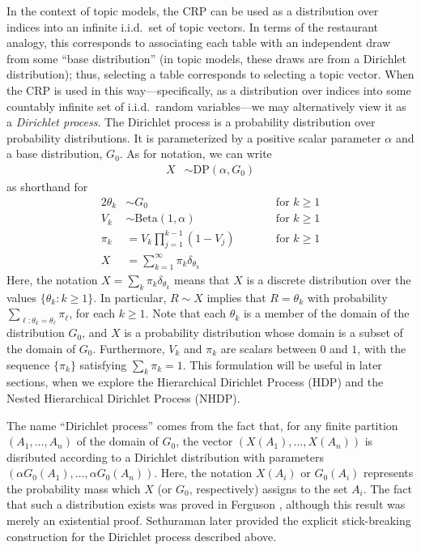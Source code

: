 \documentclass{article}
\begin{document}
In the context of topic models, the CRP can be used as a distribution over indices into an infinite i.i.d.\ set of topic vectors.
In terms of the restaurant analogy, this corresponds to associating each table with an independent draw from some ``base distribution'' (in topic models, these draws are from a Dirichlet distribution); thus, selecting a table corresponds to selecting a topic vector.
When the CRP is used in this way---specifically, as a distribution over indices into some countably infinite set of i.i.d.\ random variables---we may alternatively view it as a \emph{Dirichlet process}.
The Dirichlet process is a probability distribution over probability distributions.
It is parameterized by a positive scalar parameter $\alpha$ and a base distribution, $G_0$.
As for notation, we can write
\begin{align}
X &\sim \text{DP}(\alpha, G_0)
\end{align}
as shorthand for
\begin{alignat}{2}
\theta_k &\sim G_0 &\qquad& \text{for $k \geq 1$} \\
V_k &\sim \text{Beta}(1, \alpha) &\qquad& \text{for $k \geq 1$} \\
\pi_k &= V_k \prod_{j=1}^{k-1} (1 - V_j) &\qquad& \text{for $k \geq 1$} \\
X &= \sum_{k=1}^\infty \pi_k \delta_{\theta_k} &&
\end{alignat}
Here, the notation $X = \sum_k \pi_k \delta_{\theta_k}$ means that $X$ is a discrete distribution over the values $\{\theta_k : k \geq 1\}$.
In particular, $R \sim X$ implies that $R = \theta_k$ with probability $\sum_{\ell : \theta_k = \theta_\ell} \pi_\ell$, for each $k \geq 1$.
Note that each $\theta_k$ is a member of the domain of the distribution $G_0$, and $X$ is a probability distribution whose domain is a subset of the domain of $G_0$.
Furthermore, $V_k$ and $\pi_k$ are scalars between $0$ and $1$, with the sequence $\{\pi_k\}$ satisfying $\sum_k \pi_k = 1$.
This formulation will be useful in later sections, when we explore the Hierarchical Dirichlet Process (HDP) and the Nested Hierarchical Dirichlet Process (NHDP).

The name ``Dirichlet process'' comes from the fact that, for any finite partition $(A_1, \ldots, A_n)$ of the domain of $G_0$, the vector $(X(A_1), \ldots, X(A_n))$ is disributed according to a Dirichlet distribution with parameters $(\alpha G_0(A_1), \ldots, \alpha G_0(A_n))$.
Here, the notation $X(A_i)$ or $G_0(A_i)$ represents the probability mass which $X$ (or $G_0$, respectively) assigns to the set $A_i$.
The fact that such a distribution exists was proved in Ferguson \cite{ferguson1973bayesian}, although this result was merely an existential proof.
Sethuraman \cite{sethuraman1994constructive} later provided the explicit stick-breaking construction for the Dirichlet process described above.
\end{document}
